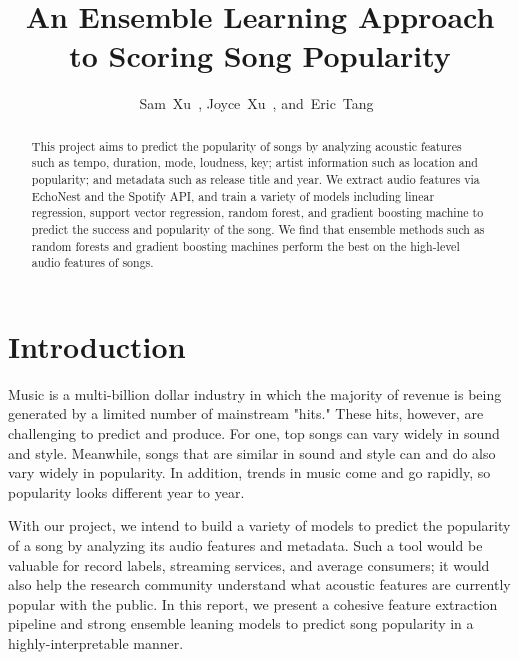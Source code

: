 \documentclass[journal]{IEEEtran}
\begin{document}
%
\title{An Ensemble Learning Approach to Scoring Song Popularity}


\author{Sam~Xu~,
        Joyce~Xu~,
        and~Eric~Tang~}


%
{}


\maketitle


\begin{abstract}
This project aims to predict the popularity of songs by analyzing acoustic features such as tempo, duration, mode, loudness, key; artist information such as location and popularity; and metadata such as release title and year. We extract audio features via EchoNest and the Spotify API, and train a variety of models including linear regression, support vector regression, random forest, and gradient boosting machine to predict the success and popularity of the song. We find that ensemble methods such as random forests and gradient boosting machines perform the best on the high-level audio features of songs.
\end{abstract}



\section{Introduction}
Music is a multi-billion dollar industry in which the majority of revenue is being generated by a limited number of mainstream "hits." These hits, however, are challenging to predict and produce. For one, top songs can vary widely in sound and style. Meanwhile, songs that are similar in sound and style can and do also vary widely in popularity. In addition, trends in music come and go rapidly, so popularity looks different year to year. 

With our project, we intend to build a variety of models to predict the popularity of a song by analyzing its audio features and metadata. Such a tool would be valuable for record labels, streaming services, and average consumers; it would also help the research community understand what acoustic features are currently popular with the public. In this report, we present a cohesive feature extraction pipeline and strong ensemble leaning models to predict song popularity in a highly-interpretable manner. 
\end{document}
